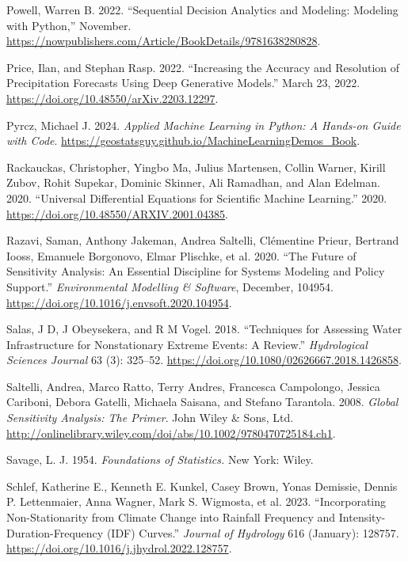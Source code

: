 \documentclass[
  letterpaper,
  DIV=11,
  numbers=noendperiod]{scrreprt}
\newlength{\cslhangindent}
\newenvironment{CSLReferences}[2] %
 {\begin{list}{}{%
  \setlength{\itemindent}{0pt}
  \setlength{\leftmargin}{0pt}
  \setlength{\parsep}{0pt}
  \ifodd #1
   \setlength{\leftmargin}{\cslhangindent}
   \setlength{\itemindent}{-1\cslhangindent}
  \fi
  \setlength{\itemsep}{#2\baselineskip}}}
 {\end{list}}
\begin{document}
\begin{CSLReferences}{1}{0}
Powell, Warren B. 2022. {``Sequential {Decision Analytics} and
{Modeling}: {Modeling} with {Python},''} November.
\url{https://nowpublishers.com/Article/BookDetails/9781638280828}.

Price, Ilan, and Stephan Rasp. 2022. {``Increasing the Accuracy and
Resolution of Precipitation Forecasts Using Deep Generative Models.''}
March 23, 2022. \url{https://doi.org/10.48550/arXiv.2203.12297}.

Pyrcz, Michael J. 2024. \emph{Applied {Machine Learning} in {Python}: A
{Hands-on Guide} with {Code}}.
\url{https://geostatsguy.github.io/MachineLearningDemos_Book}.

Rackauckas, Christopher, Yingbo Ma, Julius Martensen, Collin Warner,
Kirill Zubov, Rohit Supekar, Dominic Skinner, Ali Ramadhan, and Alan
Edelman. 2020. {``Universal {Differential Equations} for {Scientific
Machine Learning}.''} 2020.
\url{https://doi.org/10.48550/ARXIV.2001.04385}.

Razavi, Saman, Anthony Jakeman, Andrea Saltelli, Clémentine Prieur,
Bertrand Iooss, Emanuele Borgonovo, Elmar Plischke, et al. 2020. {``The
Future of Sensitivity Analysis: An Essential Discipline for Systems
Modeling and Policy Support.''} \emph{Environmental Modelling \&
Software}, December, 104954.
\url{https://doi.org/10.1016/j.envsoft.2020.104954}.

Salas, J D, J Obeysekera, and R M Vogel. 2018. {``Techniques for
Assessing Water Infrastructure for Nonstationary Extreme Events: A
Review.''} \emph{Hydrological Sciences Journal} 63 (3): 325--52.
\url{https://doi.org/10.1080/02626667.2018.1426858}.

Saltelli, Andrea, Marco Ratto, Terry Andres, Francesca Campolongo,
Jessica Cariboni, Debora Gatelli, Michaela Saisana, and Stefano
Tarantola. 2008. \emph{Global Sensitivity Analysis: The Primer}. John
Wiley \& Sons, Ltd.
\url{http://onlinelibrary.wiley.com/doi/abs/10.1002/9780470725184.ch1}.

Savage, L. J. 1954. \emph{Foundations of Statistics.} New York: Wiley.

Schlef, Katherine E., Kenneth E. Kunkel, Casey Brown, Yonas Demissie,
Dennis P. Lettenmaier, Anna Wagner, Mark S. Wigmosta, et al. 2023.
{``Incorporating Non-Stationarity from Climate Change into Rainfall
Frequency and Intensity-Duration-Frequency ({IDF}) Curves.''}
\emph{Journal of Hydrology} 616 (January): 128757.
\url{https://doi.org/10.1016/j.jhydrol.2022.128757}.


\end{CSLReferences}
\end{document}
